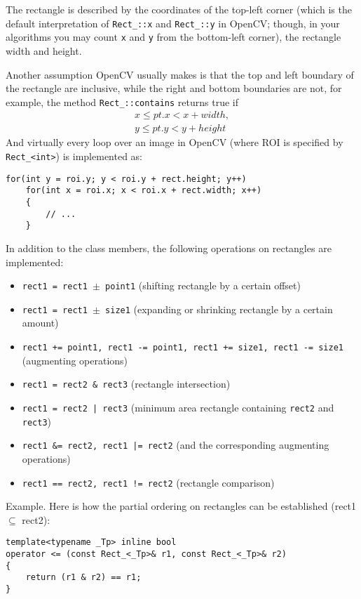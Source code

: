 The rectangle is described by the coordinates of the top-left corner (which is the default interpretation of \texttt{Rect\_::x} and \texttt{Rect\_::y} in OpenCV; though, in your algorithms you may count \texttt{x} and \texttt{y} from the bottom-left corner), the rectangle width and height.

Another assumption OpenCV usually makes is that the top and left boundary of the rectangle are inclusive, while the right and bottom boundaries are not, for example, the method \texttt{Rect\_::contains} returns true if
\begin{eqnarray*}
      x \leq pt.x < x+width,\\
      y \leq pt.y < y+height
\end{eqnarray*}
And virtually every loop over an image  in OpenCV (where ROI is specified by \texttt{Rect\_<int>}) is implemented as:
\begin{lstlisting}
for(int y = roi.y; y < roi.y + rect.height; y++)
    for(int x = roi.x; x < roi.x + rect.width; x++)
    {
        // ...
    }
\end{lstlisting}

In addition to the class members, the following operations on rectangles are implemented:
\begin{itemize}
    \item \texttt{rect1 = rect1 $\pm$ point1} (shifting rectangle by a certain offset)
    \item \texttt{rect1 = rect1 $\pm$ size1} (expanding or shrinking rectangle by a certain amount)
    \item \texttt{rect1 += point1, rect1 -= point1, rect1 += size1, rect1 -= size1} (augmenting operations)
    \item \texttt{rect1 = rect2 \& rect3} (rectangle intersection)
    \item \texttt{rect1 = rect2 | rect3} (minimum area rectangle containing \texttt{rect2} and \texttt{rect3})
    \item \texttt{rect1 \&= rect2, rect1 |= rect2} (and the corresponding augmenting operations)
    \item \texttt{rect1 == rect2, rect1 != rect2} (rectangle comparison)
\end{itemize}

Example. Here is how the partial ordering on rectangles can be established (rect1 $\subseteq$ rect2):
\begin{lstlisting}
template<typename _Tp> inline bool
operator <= (const Rect_<_Tp>& r1, const Rect_<_Tp>& r2)
{
    return (r1 & r2) == r1;
}
\end{lstlisting}

